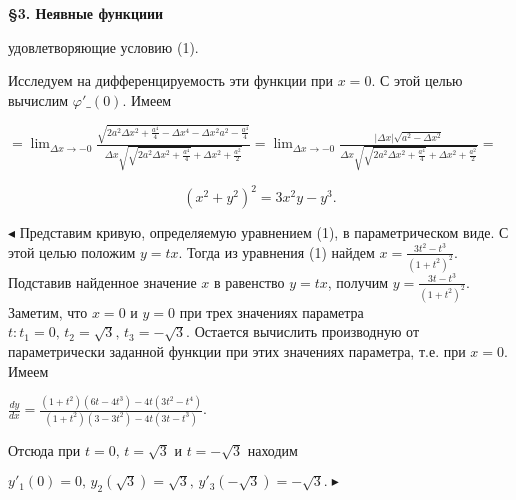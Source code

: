 \documentclass[12pt,a4paper]{book}
\begin{document}
    \begin{center}
        \textbf{\S 3. Неявные функциии}
    \end{center}
    удовлетворяющие условию (1).
    
    Исследуем на дифференцируемость эти функции при $x = 0$. С этой целью вычислим $\varphi'\_(0)$. Имеем
    \begin{center}
        $\displaystyle = \lim_{\Delta x \to -0} \frac{\sqrt{2 a^2 \Delta x^2 + \frac{a^4}{4} - \Delta x^4 - \Delta x^2 a^2 - \frac{a^4}{4}}}{\Delta x \sqrt{\sqrt{2a^2 \Delta x^2 + \frac{a^4}{4}} + \Delta x^2 + \frac{a^2}{2}}} = \lim_{\Delta x \to -0} \frac{|\Delta x| \sqrt{a^2 - \Delta x^2}}{\Delta x \sqrt{\sqrt{2a^2 \Delta x^2 + \frac{a^4}{4}} + \Delta x^2 + \frac{a^2}{2}}} =$
    \end{center}
    
    \begin{equation}
        (x^2+y^2)^2 = 3x^2y - y^3.
    \end{equation}
    
    $\blacktriangleleft$ Представим кривую, определяемую уравнением (1), в параметрическом виде. С этой целью положим $y = tx$. Тогда из уравнения (1) найдем $x = \frac{3t^2 - t^3}{(1+t^2)^2}.$ Подставив найденное значение $x$ в равенство $y = tx$, получим $y = \frac{3t-t^3}{(1+t^2)^2}$. Заметим, что $x = 0$ и $y = 0$ при трех значениях параметра $t : t_{1} = 0, \, t_{2} = \sqrt{3}, \, t_{3} = - \sqrt{3}$. Остается вычислить производную от параметрически заданной функции при этих значениях параметра, т.е. при $x = 0$. Имеем
    \begin{center}
        $\displaystyle\frac{dy}{dx} = \frac{(1+t^2)(6t - 4t^3) - 4t(3t^2 - t^4)}{(1+t^2)(3-3t^2) - 4t(3t-t^3)}.$
    \end{center}
    Отсюда при $t = 0, \, t = \sqrt{3}$ и $t = -\sqrt{3}$ находим
    \begin{center}
        $\displaystyle y'_{1}(0) = 0, \, y_{2}(\sqrt{3}) = \sqrt{3}, \, y'_{3}(-\sqrt{3}) = - \sqrt{3}. \blacktriangleright$
    \end{center}
    
\end{document}
